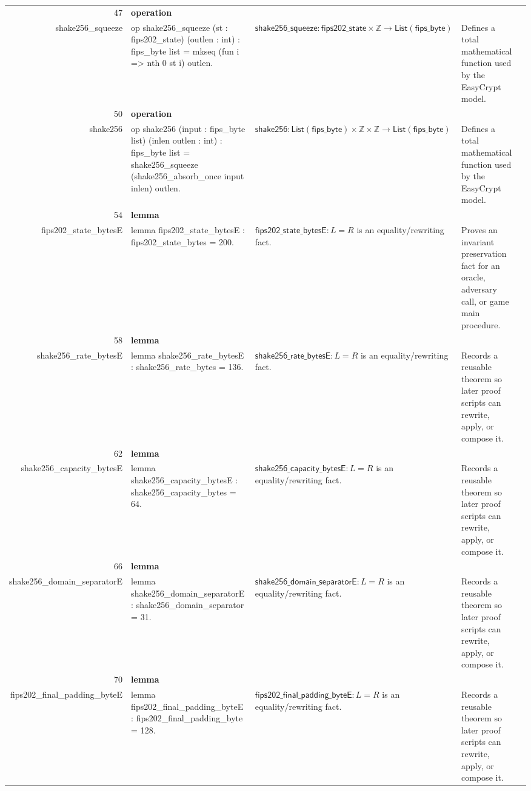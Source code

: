 \documentclass[10pt]{article}
\newcommand{\ec}[1]{\begingroup\ttfamily\scriptsize #1\endgroup}
\begin{document}
\begin{longtable}{r L{0.17\textwidth} L{0.26\textwidth} L{0.27\textwidth} L{0.20\textwidth}}
47 & \textbf{operation}\\\ec{shake256\_squeeze} & \ec{op shake256\_squeeze (st : fips202\_state) (outlen : int) : fips\_byte list = mkseq (fun i => nth 0 st i) outlen.} & \(\mathsf{shake256\_squeeze} : \mathsf{fips202\_state} \times \mathbb{Z} \to \mathsf{List}(\mathsf{fips\_byte})\) & Defines a total mathematical function used by the EasyCrypt model. \\
50 & \textbf{operation}\\\ec{shake256} & \ec{op shake256 (input : fips\_byte list) (inlen outlen : int) : fips\_byte list = shake256\_squeeze (shake256\_absorb\_once input inlen) outlen.} & \(\mathsf{shake256} : \mathsf{List}(\mathsf{fips\_byte}) \times \mathbb{Z} \times \mathbb{Z} \to \mathsf{List}(\mathsf{fips\_byte})\) & Defines a total mathematical function used by the EasyCrypt model. \\
54 & \textbf{lemma}\\\ec{fips202\_state\_bytesE} & \ec{lemma fips202\_state\_bytesE : fips202\_state\_bytes = 200.} & \(\mathsf{fips202\_state\_bytesE} : L = R\) is an equality/rewriting fact. & Proves an invariant preservation fact for an oracle, adversary call, or game main procedure. \\
58 & \textbf{lemma}\\\ec{shake256\_rate\_bytesE} & \ec{lemma shake256\_rate\_bytesE : shake256\_rate\_bytes = 136.} & \(\mathsf{shake256\_rate\_bytesE} : L = R\) is an equality/rewriting fact. & Records a reusable theorem so later proof scripts can rewrite, apply, or compose it. \\
62 & \textbf{lemma}\\\ec{shake256\_capacity\_bytesE} & \ec{lemma shake256\_capacity\_bytesE : shake256\_capacity\_bytes = 64.} & \(\mathsf{shake256\_capacity\_bytesE} : L = R\) is an equality/rewriting fact. & Records a reusable theorem so later proof scripts can rewrite, apply, or compose it. \\
66 & \textbf{lemma}\\\ec{shake256\_domain\_separatorE} & \ec{lemma shake256\_domain\_separatorE : shake256\_domain\_separator = 31.} & \(\mathsf{shake256\_domain\_separatorE} : L = R\) is an equality/rewriting fact. & Records a reusable theorem so later proof scripts can rewrite, apply, or compose it. \\
70 & \textbf{lemma}\\\ec{fips202\_final\_padding\_byteE} & \ec{lemma fips202\_final\_padding\_byteE : fips202\_final\_padding\_byte = 128.} & \(\mathsf{fips202\_final\_padding\_byteE} : L = R\) is an equality/rewriting fact. & Records a reusable theorem so later proof scripts can rewrite, apply, or compose it. \\

\end{longtable}
\end{document}
